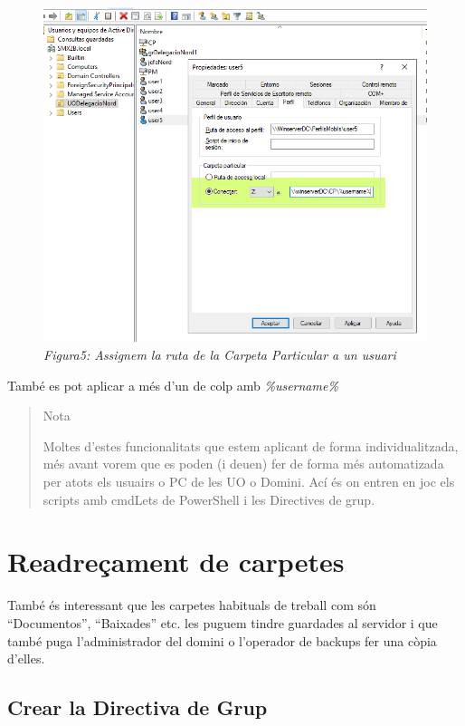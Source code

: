 \documentclass[
  a4paper,
]{article}
\begin{document}
\begin{figure}
\centering
\includegraphics{png/RutaCarpetaParticular.png}
\caption{\emph{Figura5: Assignem la ruta de la Carpeta Particular a un
usuari}}
\end{figure}

També es pot aplicar a més d'un de colp amb \emph{\%username\%}

\begin{quote}
Nota

Moltes d'estes funcionalitats que estem aplicant de forma
individualitzada, més avant vorem que es poden (i deuen) fer de forma
més automatizada per atots els usuairs o PC de les UO o Domini. Ací és
on entren en joc els scripts amb cmdLets de PowerShell i les Directives
de grup.
\end{quote}

\section{Readreçament de carpetes}\label{readreuxe7ament-de-carpetes}

També és interessant que les carpetes habituals de treball com són
``Documentos'', ``Baixades'' etc. les puguem tindre guardades al
servidor i que també puga l'administrador del domini o l'operador de
backups fer una còpia d'elles.

\subsection{Crear la Directiva de
Grup}\label{crear-la-directiva-de-grup}
\end{document}
